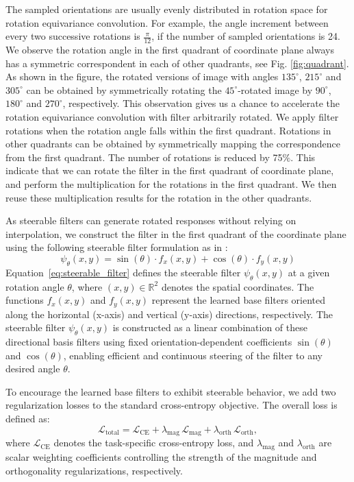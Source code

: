 The sampled orientations are usually evenly distributed in rotation space for rotation equivariance convolution. For example, the angle increment between every two successive rotations is $\frac{\pi}{12}$, if the number of sampled orientations is 24. We observe the rotation angle in the first quadrant of coordinate plane always has a symmetric correspondent in each of other quadrants, see Fig. \ref{fig:quadrant}. As shown in the figure, the rotated versions of image with angles $135^\circ$, $215^\circ$ and $305^\circ$ can be obtained by symmetrically rotating the $45^\circ$-rotated image by $90^\circ$, $180^\circ$ and $270^\circ$, respectively.    
This observation gives us a chance to accelerate the rotation equivariance convolution with filter arbitrarily rotated. We apply filter rotations when the rotation angle falls within the first quadrant. Rotations in other quadrants can be obtained by symmetrically mapping the correspondence from the first quadrant. The number of rotations is reduced by 75$\%$. This indicate that we can rotate the filter in the first quadrant of coordinate plane, and perform the multiplication for the rotations in the first quadrant. We then reuse these multiplication results for the rotation in the other quadrants. 

As steerable filters can generate rotated responses without relying on interpolation,  
we construct the filter in the first quadrant of the coordinate plane using the following steerable filter formulation as in \cite{93808}:
\begin{equation}
\psi_\theta(x, y) = \sin(\theta) \cdot f_x(x, y) + \cos(\theta) \cdot f_y(x, y)
\label{eq:steerable_filter}
\end{equation}
Equation~\eqref{eq:steerable_filter} defines the steerable filter \( \psi_\theta(x, y) \) at a given rotation angle \( \theta \),  
where \( (x, y) \in \mathbb{R}^2 \) denotes the spatial coordinates.
The functions \( f_x(x, y) \) and \( f_y(x, y) \) represent the learned base filters oriented along the horizontal (x-axis)  
and vertical (y-axis) directions, respectively. The steerable filter \( \psi_\theta(x, y) \) is constructed as a linear combination  
of these directional basis filters using fixed orientation-dependent coefficients \( \sin(\theta) \) and \( \cos(\theta) \),  
enabling efficient and continuous steering of the filter to any desired angle \( \theta \).

To encourage the learned base filters to exhibit steerable behavior, we add two regularization losses to the standard
cross-entropy objective. The overall loss is defined as:
\begin{equation}
\mathcal{L}_{\text{total}}
=
\mathcal{L}_{\text{CE}}
+
\lambda_{\text{mag}}\,\mathcal{L}_{\text{mag}}
+
\lambda_{\text{orth}}\,\mathcal{L}_{\text{orth}} ,
\label{eq:total_loss}
\end{equation}
where \( \mathcal{L}_{\text{CE}} \) denotes the task-specific cross-entropy loss,
and \( \lambda_{\text{mag}} \) and \( \lambda_{\text{orth}} \) are scalar weighting coefficients controlling
the strength of the magnitude and orthogonality regularizations, respectively.

